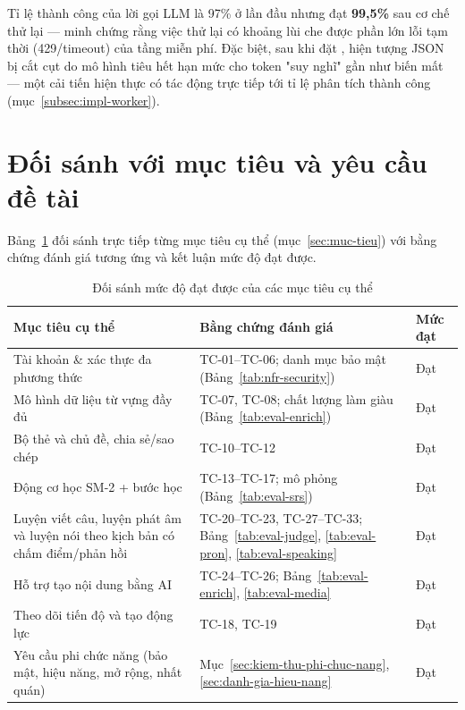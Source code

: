 Tỉ lệ thành công của lời gọi LLM là 97\% ở lần đầu nhưng đạt \textbf{99,5\%}
sau cơ chế thử lại --- minh chứng rằng việc thử lại có khoảng lùi che được phần
lớn lỗi tạm thời (429/timeout) của tầng miễn phí. Đặc biệt, sau khi đặt
, hiện tượng JSON bị cắt cụt do mô hình tiêu hết hạn
mức cho token "suy nghĩ" gần như biến mất --- một cải tiến hiện thực có tác
động trực tiếp tới tỉ lệ phân tích thành công (mục~\ref{subsec:impl-worker}).

\section{Đối sánh với mục tiêu và yêu cầu đề tài}
\label{sec:doi-sanh-muc-tieu}

Bảng~\ref{tab:eval-objectives} đối sánh trực tiếp từng mục tiêu cụ thể
(mục~\ref{sec:muc-tieu}) với bằng chứng đánh giá tương ứng và kết luận mức độ
đạt được.

\begin{table}[h]
  \centering
  \small
  \renewcommand{\arraystretch}{1.3}
  \begin{tabular}{|p{5.4cm}|p{6.6cm}|p{1.8cm}|}
    \hline
    \textbf{Mục tiêu cụ thể} & \textbf{Bằng chứng đánh giá} & \textbf{Mức đạt} \\
    \hline
    Tài khoản \& xác thực đa phương thức & TC-01--TC-06; danh mục bảo mật (Bảng~\ref{tab:nfr-security}) & Đạt \\
    \hline
    Mô hình dữ liệu từ vựng đầy đủ & TC-07, TC-08; chất lượng làm giàu (Bảng~\ref{tab:eval-enrich}) & Đạt \\
    \hline
    Bộ thẻ và chủ đề, chia sẻ/sao chép & TC-10--TC-12 & Đạt \\
    \hline
    Động cơ học SM-2 + bước học & TC-13--TC-17; mô phỏng (Bảng~\ref{tab:eval-srs}) & Đạt \\
    \hline
    Luyện viết câu, luyện phát âm và luyện nói theo kịch bản có chấm điểm/phản hồi & TC-20--TC-23, TC-27--TC-33; Bảng~\ref{tab:eval-judge}, \ref{tab:eval-pron}, \ref{tab:eval-speaking} & Đạt \\
    \hline
    Hỗ trợ tạo nội dung bằng AI & TC-24--TC-26; Bảng~\ref{tab:eval-enrich}, \ref{tab:eval-media} & Đạt \\
    \hline
    Theo dõi tiến độ và tạo động lực & TC-18, TC-19 & Đạt \\
    \hline
    Yêu cầu phi chức năng (bảo mật, hiệu năng, mở rộng, nhất quán) & Mục~\ref{sec:kiem-thu-phi-chuc-nang}, \ref{sec:danh-gia-hieu-nang} & Đạt \\
    \hline
  \end{tabular}
  \caption{Đối sánh mức độ đạt được của các mục tiêu cụ thể}
  \label{tab:eval-objectives}
\end{table}

